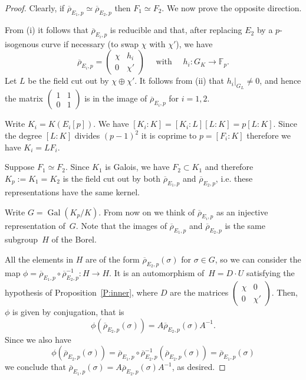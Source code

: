 \documentclass[12pt, reqno]{amsart}
\newcommand{\F}{\mathbb{F}}
\newcommand{\rhobar}{{\overline{\rho}}}
\DeclareMathOperator{\Gal}{Gal}
\numberwithin{equation}{section}
\theoremstyle{definition}
\theoremstyle{remark}
\begin{document}
\begin{proof} Clearly, 
if $\rhobar_{E_1,p} \simeq \rhobar_{E_2,p}$ 
then $F_1 \simeq F_2$. We now prove the opposite direction.

From (i) it follows that $\rhobar_{E_i,p}$ is reducible and that, after replacing $E_2$ by a $p$-isogenous curve if necessary (to swap 
$\chi$ with $\chi'$), 
we have 
\[
\rhobar_{E_i,p} =  \begin{pmatrix}
                            \chi & h_i \\
                            0 & \chi'
                            \end{pmatrix} \quad \text{ with } \quad  h_i : G_K \to \F_p.  
\]
Let $L$ be the field cut out 
by $\chi \oplus \chi'$. 
It follows from (ii) that $h_i|_{G_L} \neq 0$, and
hence the matrix $\left(\begin{smallmatrix}
                            1 & 1 \\
                            0 & 1
                            \end{smallmatrix} \right)$  
is in the image of $\rhobar_{E_i,p}$ for $i=1,2$.
                            
Write $K_i = K(E_i[p])$. 
We have $[K_i : K] = [K_i : L][L : K] = p [L : K]$. 
Since the degree $[L : K]$ divides $(p-1)^2$ it is coprime 
to $p = [F_i : K]$ therefore we have $K_i = L F_i$.

Suppose $F_1 \simeq F_2$. Since $K_1$ is Galois, we have $F_2 \subset K_1$ and therefore $K_p := K_1 = K_2$ is the field cut out by both
$\rhobar_{E_1,p}$ and $\rhobar_{E_2,p}$, i.e. these representations have the same kernel.

Write $G = \Gal(K_p / K)$. From now on we think of $\rhobar_{E_i,p}$ as an injective representation of~$G$. Note that the images of $\rhobar_{E_1,p}$ and $\rhobar_{E_2,p}$
is the same subgroup~$H$ of the Borel.

All the elements in $H$ are of the form $\rhobar_{E_2,p}(\sigma)$ for $\sigma \in G$, so we can consider the map $\phi = \rhobar_{E_1,p} \circ \rhobar_{E_2,p}^{-1} : H \to H$. It is an automorphism of~$H = D\cdot U$ satisfying the hypothesis of Proposition~\ref{P:inner}, where $D$ are 
the matrices $\left(\begin{smallmatrix}
                            \chi & 0 \\
                            0 & \chi'
                            \end{smallmatrix} \right)$.  
Then, $\phi$ is given by conjugation, that is
\[
 \phi(\rhobar_{E_2,p}(\sigma)) = A \rhobar_{E_2,p}(\sigma) A^{-1}.
\]
Since we also have
\[ 
\phi(\rhobar_{E_2,p}(\sigma)) 
=  \rhobar_{E_1,p} \circ \rhobar_{E_2,p}^{-1}(\rhobar_{E_2,p}(\sigma)) = \rhobar_{E_1,p}(\sigma)
\]
we conclude that $\rhobar_{E_1,p}(\sigma) = A \rhobar_{E_2,p}(\sigma) A^{-1}$, as desired.
\end{proof}
\end{document}

